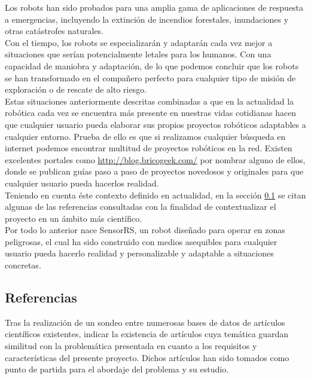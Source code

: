Los robots han sido probados para una amplia gama de aplicaciones de respuesta a emergencias, incluyendo la extinción de incendios forestales, inundaciones y otras catástrofes
naturales.\\

Con el tiempo, los robots se especializarán y adaptarán cada vez mejor a situaciones que serían potencialmente letales para los humanos. Con una capacidad de maniobra y adaptación,
de lo que podemos concluir que los robots se han transformado en el compañero perfecto para cualquier tipo de misión de exploración o de rescate de alto riesgo.\\

Estas situaciones anteriormente descritas combinadas a que en la actualidad la robótica cada vez se encuentra más presente en nuestras vidas cotidianas hacen que cualquier usuario
pueda elaborar sus propios proyectos robóticos adaptables a cualquier entorno. Prueba de ello es que si realizamos cualquier búsqueda en internet podemos encontrar multitud 
de proyectos robóticos en la red. Existen excelentes portales como \url{http://blog.bricogeek.com/} por nombrar alguno de ellos, donde se
publican guías paso a paso de proyectos novedosos y originales para que cualquier usuario pueda hacerlos realidad.\\

Teniendo en cuenta éste contexto definido en actualidad, en la sección \ref{sec:referencias} se citan algunas de las referencias consultadas con la finalidad de contextualizar el proyecto 
en un ámbito más científico.\\

Por todo lo anterior nace SensorRS, un robot diseñado para operar en zonas peligrosas, el cual ha sido construido con medios asequibles para cualquier usuario pueda hacerlo realidad y 
personalizable y adaptable a situaciones concretas.\\

\subsection{ Referencias }
\label{sec:referencias}

Tras la realización de un sondeo entre numerosas bases de datos de artículos científicos existentes, indicar la existencia de artículos cuya temática guardan similitud con la problemática presentada
en cuanto a los requisitos y características del presente proyecto. Dichos artículos han sido tomados como punto de partida para el abordaje del problema y su estudio.\\

